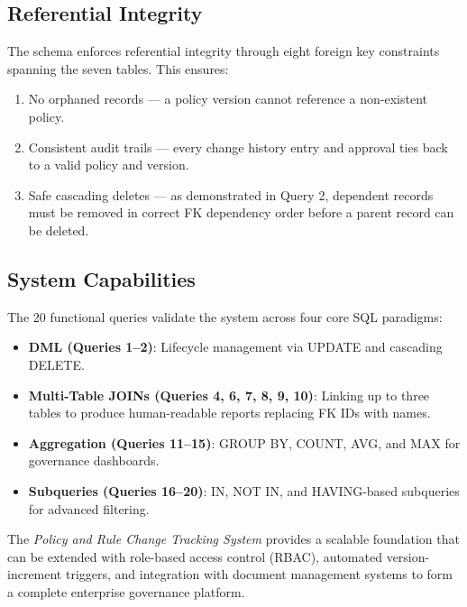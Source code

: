 \documentclass[conference]{IEEEtran}
\begin{document}
\subsection{Referential Integrity}
The schema enforces referential integrity through eight foreign key constraints spanning the seven tables. This ensures:
\begin{enumerate}
  \item No orphaned records — a policy version cannot reference a non-existent policy.
  \item Consistent audit trails — every change history entry and approval ties back to a valid policy and version.
  \item Safe cascading deletes — as demonstrated in Query 2, dependent records must be removed in correct FK dependency order before a parent record can be deleted.
\end{enumerate}

\subsection{System Capabilities}
The 20 functional queries validate the system across four core SQL paradigms:
\begin{itemize}
  \item \textbf{DML (Queries 1--2)}: Lifecycle management via UPDATE and cascading DELETE.
  \item \textbf{Multi-Table JOINs (Queries 4, 6, 7, 8, 9, 10)}: Linking up to three tables to produce human-readable reports replacing FK IDs with names.
  \item \textbf{Aggregation (Queries 11--15)}: GROUP BY, COUNT, AVG, and MAX for governance dashboards.
  \item \textbf{Subqueries (Queries 16--20)}: IN, NOT IN, and HAVING-based subqueries for advanced filtering.
\end{itemize}

The \textit{Policy and Rule Change Tracking System} provides a scalable foundation that can be extended with role-based access control (RBAC), automated version-increment triggers, and integration with document management systems to form a complete enterprise governance platform.
\end{document}
